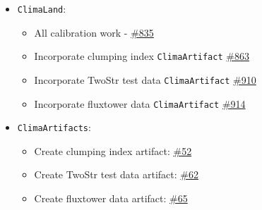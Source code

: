 \documentclass[11pt, a4paper]{article}
\begin{document}
\begin{itemize}
    \item \texttt{ClimaLand}:
    \begin{itemize}
        \item All calibration work -
              \href{https://github.com/CliMA/ClimaLand.jl/pull/835}{\#835}
        \item Incorporate clumping index \texttt{ClimaArtifact}
              \href{https://github.com/CliMA/ClimaLand.jl/pull/863}{\#863}
        \item Incorporate TwoStr test data \texttt{ClimaArtifact}
              \href{https://github.com/CliMA/ClimaLand.jl/pull/910}{\#910}
        \item Incorporate fluxtower data \texttt{ClimaArtifact}
              \href{https://github.com/CliMA/ClimaLand.jl/pull/914}{\#914}
    \end{itemize}
    \item \texttt{ClimaArtifacts}:
    \begin{itemize}
        \item Create clumping index artifact: 
              \href{https://github.com/CliMA/ClimaArtifacts/pull/52}{\#52}
        \item Create TwoStr test data artifact:
              \href{https://github.com/CliMA/ClimaArtifacts/pull/62}{\#62}
        \item Create fluxtower data artifact:
              \href{https://github.com/CliMA/ClimaArtifacts/pull/65}{\#65}
    \end{itemize}
\end{itemize}
\end{document}
